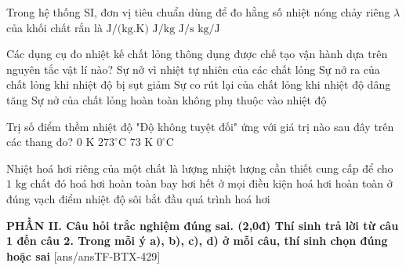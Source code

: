 \begin{ex}	Trong hệ thống SI, đơn vị tiêu chuẩn dùng để đo hằng số nhiệt nóng chảy riêng $\lambda$ của khối chất rắn là
	\choice
	{$\text{J/(kg.K)}$}
	{\True $\text{J/kg}$}
	{$\text{J/s}$}
	{$\text{kg/J}$}
\end{ex}

\begin{ex}	Các dụng cụ đo nhiệt kế chất lỏng thông dụng được chế tạo vận hành dựa trên nguyên tắc vật lí nào?
	\choice
	{\True Sự nở vì nhiệt tự nhiên của các chất lỏng}
	{Sự nở ra của chất lỏng khi nhiệt độ bị sụt giảm}
	{Sự co rút lại của chất lỏng khi nhiệt độ dâng tăng}
	{Sự nở của chất lỏng hoàn toàn không phụ thuộc vào nhiệt độ}
\end{ex}

\begin{ex}	Trị số điểm thềm nhiệt độ "Độ không tuyệt đối" ứng với giá trị nào sau đây trên các thang đo?
	\choice
	{\True $0\text{ K}$}
	{$273^\circ\text{C}$}
	{$73\text{ K}$}
	{$0^\circ\text{C}$}
\end{ex}

\begin{ex}	Nhiệt hoá hơi riêng của một chất là lượng nhiệt lượng cần thiết cung cấp để cho $1\text{ kg}$ chất đó
	\choice
	{hoá hơi hoàn toàn}
	{bay hơi hết ở mọi điều kiện}
	{\True hoá hơi hoàn toàn ở đúng vạch điểm nhiệt độ sôi}
	{bắt đầu quá trình hoá hơi}
\end{ex}


\noindent \textbf{PHẦN II. Câu hỏi trắc nghiệm đúng sai. (2,0đ) Thí sinh trả lời từ câu 1 đến câu 2. Trong mỗi ý a), b), c), d) ở mỗi câu, thí sinh chọn đúng hoặc sai}
[ans/ansTF-BTX-429]

